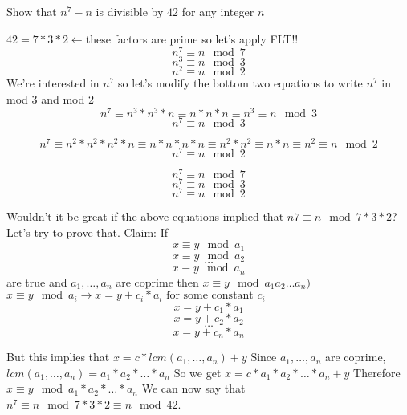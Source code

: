 \question Show that $n^7 - n$ is divisible by $42$ for any integer $n$
\begin{solution}[1 in]
$42 = 7 * 3 * 2 \leftarrow$these factors are prime so let’s apply 
FLT!! \newline
\[n^7 \equiv n \mod 7\]
\[n^3 \equiv n \mod 3\]
\[n^2 \equiv n \mod 2\]
We’re interested in $n^7$ so let’s modify the bottom two equations to 
write $n^7$ in mod 3 and mod 2 \newline
\[n^7 \equiv n^3 * n^3 * n \equiv n * n * n \equiv n^3 \equiv n \mod 3\]
\[n^7 \equiv n \mod 3\]

\[n^7 \equiv n^2 * n^2 * n^2 * n \equiv n * n * n * n \equiv n^2 * n^2 
\equiv n * n \equiv n^2 \equiv n \mod 2\]
\[n^7 \equiv n \mod 2\]

\[n^7 \equiv n \mod 7\]
\[n^7 \equiv n \mod 3\]
\[n^7 \equiv n \mod 2\]

Wouldn’t it be great if the above equations implied that $n7 \equiv n 
\mod 7 * 3 * 2$? \newline
Let’s try to prove that. \newline
Claim: If  \newline
	\[x \equiv y \mod a_1\]
\[	x \equiv y \mod a_2\]
	        \[\dotsc\]
	\[x \equiv y \mod a_n\]
are true  and $a_1, \dotsc, a_n$ are coprime then $x \equiv y \mod a_1 
a_2 \dotsc a_n)$\newline
$x \equiv y \mod a_i \rightarrow x = y + c_i*a_i \text{ for some constant } c_i$
	\[ x = y + c_1*a_1 \]
\[	 x = y + c_2*a_2 \]
	\[  \dotsc \]
\[	 x = y + c_n*a_n \]

	But this implies that $x = c * lcm(a_1, \dotsc, a_n) + y$ \newline
	Since $a_1, \dotsc, a_n$ are coprime, $lcm(a_1, \dotsc, a_n) = 
	a_1*a_2*\dotsc* a_n$\newline
	So we get $x = c *  a_1*a_2*\dotsc* a_n + y$\newline
	Therefore $x \equiv y \mod a_1*a_2* \dotsc *a_n$\newline
We can now say that $n^7 \equiv n \mod 7*3*2 \equiv n \mod 42$.


\end{solution}